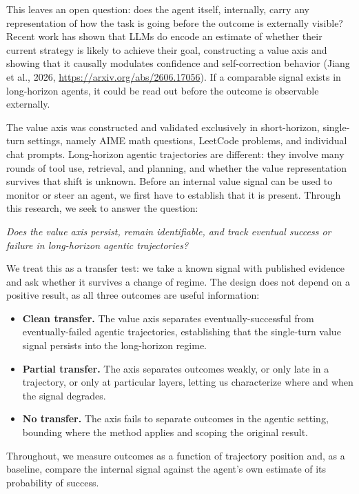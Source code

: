 \documentclass{article}
\begin{document}
This leaves an open question: does the agent itself, internally, carry any representation of how the task is going before the outcome is externally visible? Recent work has shown that LLMs do encode an estimate of whether their current strategy is likely to achieve their goal, constructing a value axis and showing that it causally modulates confidence and self-correction behavior (Jiang et al., 2026, \url{https://arxiv.org/abs/2606.17056}). If a comparable signal exists in long-horizon agents, it could be read out before the outcome is observable externally.

The value axis was constructed and validated exclusively in short-horizon, single-turn settings, namely AIME math questions, LeetCode problems, and individual chat prompts. Long-horizon agentic trajectories are different: they involve many rounds of tool use, retrieval, and planning, and whether the value representation survives that shift is unknown. Before an internal value signal can be used to monitor or steer an agent, we first have to establish that it is present. Through this research, we seek to answer the question:

\textit{Does the value axis persist, remain identifiable, and track eventual success or failure in long-horizon agentic trajectories?}

We treat this as a transfer test: we take a known signal with published evidence and ask whether it survives a change of regime. The design does not depend on a positive result, as all three outcomes are useful information:

\begin{itemize}
\item \textbf{Clean transfer.} The value axis separates eventually-successful from eventually-failed agentic trajectories, establishing that the single-turn value signal persists into the long-horizon regime.
\item \textbf{Partial transfer.} The axis separates outcomes weakly, or only late in a trajectory, or only at particular layers, letting us characterize where and when the signal degrades.
\item \textbf{No transfer.} The axis fails to separate outcomes in the agentic setting, bounding where the method applies and scoping the original result.
\end{itemize}

Throughout, we measure outcomes as a function of trajectory position and, as a baseline, compare the internal signal against the agent's own estimate of its probability of success.
\end{document}
